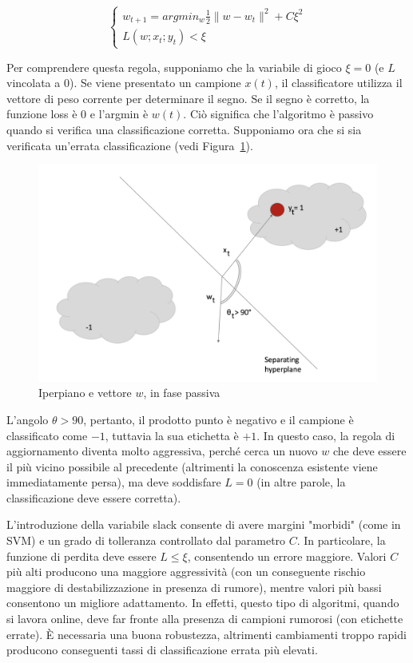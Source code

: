 $$\left\{
                \begin{array}{ll}
                  w_{t+1}=argmin_w\frac{1}{2}\| w-w_t\|^2 +C\xi^2\\
                  L(w;x_t;y_t) < \xi
                \end{array}
              \right.$$
              
Per comprendere questa regola, supponiamo che la variabile di gioco $\xi = 0$ (e $L$ vincolata a $0$). Se viene presentato un campione $x(t)$, il classificatore utilizza il vettore di peso corrente per determinare il segno. Se il segno è corretto, la funzione loss è $0$ e l'argmin è $w(t)$. Ciò significa che l'algoritmo è passivo quando si verifica una classificazione corretta. Supponiamo ora che si sia verificata un'errata classificazione (vedi Figura~\ref{fig:PAII1}).            
              
\begin{figure}[h]
    \centering
    \includegraphics[scale=0.5]{Figure/PAII1.png}
    \caption{Iperpiano e vettore $w$, in fase passiva}
    \label{fig:PAII1}
\end{figure}
\FloatBarrier  

L'angolo $\theta> 90$, pertanto, il prodotto punto è negativo e il campione è classificato come $-1$, tuttavia la sua etichetta è $+1$. In questo caso, la regola di aggiornamento diventa molto aggressiva, perché cerca un nuovo $w$ che deve essere il più vicino possibile al precedente (altrimenti la conoscenza esistente viene immediatamente persa), ma deve soddisfare $L = 0$ (in altre parole, la classificazione deve essere corretta).

L'introduzione della variabile slack consente di avere margini "morbidi" (come in SVM) e un grado di tolleranza controllato dal parametro $C$. In particolare, la funzione di perdita deve essere $L \leq \xi$, consentendo un errore maggiore. Valori $C$ più alti producono una maggiore aggressività (con un conseguente rischio maggiore di destabilizzazione in presenza di rumore), mentre valori più bassi consentono un migliore adattamento. In effetti, questo tipo di algoritmi, quando si lavora online, deve far fronte alla presenza di campioni rumorosi (con etichette errate). È necessaria una buona robustezza, altrimenti cambiamenti troppo rapidi producono conseguenti tassi di classificazione errata più elevati.

